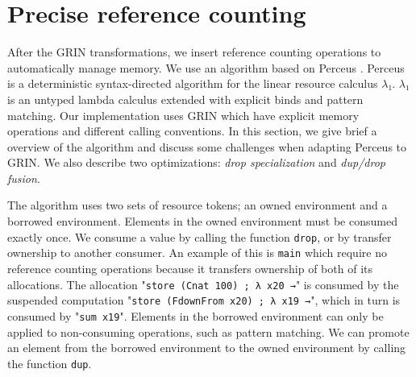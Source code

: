 \documentclass[10pt, twocolumn]{article}
\begin{document}
\section{Precise reference counting}
After the GRIN transformations, we insert reference counting operations to automatically manage memory.
We use an algorithm based on Perceus \citep{reinking2021}. 
Perceus is a deterministic syntax-directed algorithm for the linear resource calculus $λ₁$.
$λ₁$ is an untyped lambda calculus extended with explicit binds and pattern matching.
Our implementation uses GRIN which have explicit memory operations and different calling conventions.
In this section, we give brief a overview of the algorithm and discuss some challenges when adapting Perceus to GRIN. 
We also describe two optimizations: \emph{drop specialization} and \emph{dup/drop fusion}.

The algorithm uses two sets of resource tokens; an owned environment and a borrowed environment. 
Elements in the owned environment must be consumed exactly once. 
We consume a value by calling the function \lstinline{drop}, or by transfer ownership to another consumer.
An example of this is \lstinline{main} which require no reference counting operations because it transfers ownership of both of its allocations.
The allocation "\lstinline{store (Cnat 100) ; λ x20 →}" is consumed by the suspended computation "\lstinline{store (FdownFrom x20) ; λ x19 →}", which in turn is consumed by "\lstinline{sum x19}".
Elements in the borrowed environment can only be applied to non-consuming operations, such as pattern matching. 
We can promote an element from the borrowed environment to the owned environment by calling the function \lstinline{dup}.
\end{document}
